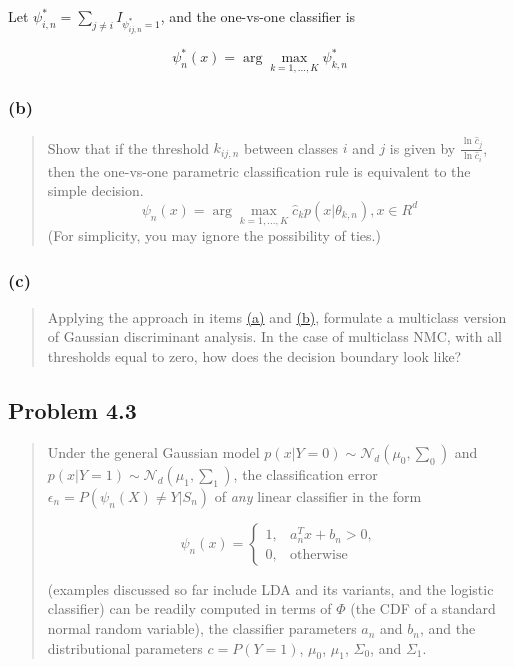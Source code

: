 \documentclass[
  letterpaper,
  DIV=11,
  numbers=noendperiod]{scrartcl}
\begin{document}
Let \(\psi^{*}_{i,n} = \sum_{j\neq i} I_{\psi^{*}_{ij,n}=1}\), and the
one-vs-one classifier is

\[\psi^{*}_{n}(x) = \arg\max_{k=1,\dots,K} \psi^{*}_{k,n}\]

\hypertarget{sec-42b}{%
\subsubsection{(b)}\label{sec-42b}}

\begin{quote}
Show that if the threshold \(k_{ij,n}\) between classes \(i\) and \(j\)
is given by \(\frac{\ln\hat{c}_j}{\ln\hat{c}_i}\), then the one-vs-one
parametric classification rule is equivalent to the simple decision.
\[\psi_{n}(x) = \arg\max_{k=1,...,K} \hat{c}_{k} p(x|\theta_{k,n}), x\in R^d\]
(For simplicity, you may ignore the possibility of ties.)
\end{quote}

\hypertarget{c}{%
\subsubsection{(c)}\label{c}}

\begin{quote}
Applying the approach in items \protect\hyperlink{sec-42a}{(a)} and
\protect\hyperlink{sec-42b}{(b)}, formulate a multiclass version of
Gaussian discriminant analysis. In the case of multiclass NMC, with all
thresholds equal to zero, how does the decision boundary look like?
\end{quote}

\hypertarget{problem-4.3}{%
\subsection{Problem 4.3}\label{problem-4.3}}

\begin{quote}
Under the general Gaussian model
\(p(x|Y=0)\sim \mathcal{N}_d(\mu_0, \sum_0)\) and
\(p(x|Y=1)\sim \mathcal{N}_d(\mu_1, \sum_1)\), the classification error
\(\epsilon_n = P(\psi_n(X)\neq Y| S_n)\) of \emph{any} linear classifier
in the form

\begin{equation}
   \psi_{n}(x) = 
   \begin{cases}
       1,& a_{n}^{T}x + b_n > 0,\\ 
       0,& \text{otherwise}
   \end{cases}
\end{equation}

(examples discussed so far include LDA and its variants, and the
logistic classifier) can be readily computed in terms of \(\Phi\) (the
CDF of a standard normal random variable), the classifier parameters
\(a_n\) and \(b_n\), and the distributional parameters \(c=P(Y=1)\),
\(\mu_0\), \(\mu_1\), \(\Sigma_0\), and \(\Sigma_1\).
\end{quote}
\end{document}
